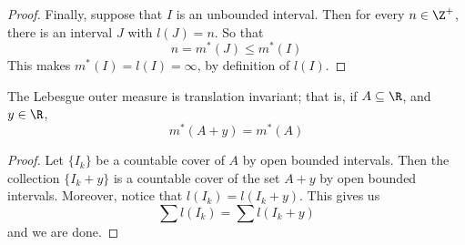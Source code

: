 \begin{proof}
    Finally, suppose that $I$ is an unbounded interval. Then for every  $n \in
    \Z^+$, there is an interval  $J$ with  $l(J)=n$. So that
    \begin{equation*}
        n=m^\ast(J) \leq m^\ast(I)
    \end{equation*}
    This makes $m^\ast(I)=l(I)=\infty$, by definition of $l(I)$.
\end{proof}

\begin{lemma}\label{8.2.5}
    The Lebesgue outer measure is translation invariant; that is, if $A
    \subseteq \R$, and  $y \in \R$,
    \begin{equation*}
        m^\ast(A+y)=m^\ast(A)
    \end{equation*}
\end{lemma}
\begin{proof}
    Let $\{I_k\}$ be a countable cover of $A$ by open bounded intervals. Then
    the collection  $\{I_k+y\}$ is a countable cover of the set $A+y$ by open
    bounded intervals. Moreover, notice that $l(I_k)=l(I_k+y)$. This gives us
    \begin{equation*}
        \sum{l(I_k)}=\sum{l(I_k+y)}
    \end{equation*}
    and we are done.
\end{proof}

